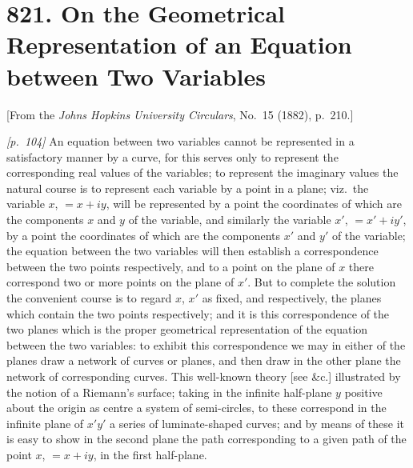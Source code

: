 \documentclass[11pt,a4paper]{article}
\theoremstyle{plain}
\theoremstyle{definition}
\theoremstyle{remark}
\begin{document}
\section*{821. On the Geometrical Representation of an Equation between Two Variables}

\begin{center}
\small[From the \textit{Johns Hopkins University Circulars}, No.~15 (1882), p.~210.]
\end{center}

\bigskip

\noindent\textit{[p.~104]} An equation between two variables cannot be represented in a satisfactory manner by a curve, for this serves only to represent the corresponding real values of the variables; to represent the imaginary values the natural course is to represent each variable by a point in a plane; viz.\ the variable $x$, $= x + iy$, will be represented by a point the coordinates of which are the components $x$ and $y$ of the variable, and similarly the variable $x'$, $= x' + iy'$, by a point the coordinates of which are the components $x'$ and $y'$ of the variable; the equation between the two variables will then establish a correspondence between the two points respectively, and to a point on the plane of $x$ there correspond two or more points on the plane of $x'$. But to complete the solution the convenient course is to regard $x$, $x'$ as fixed, and respectively, the planes which contain the two points respectively; and it is this correspondence of the two planes which is the proper geometrical representation of the equation between the two variables: to exhibit this correspondence we may in either of the planes draw a network of curves or planes, and then draw in the other plane the network of corresponding curves. This well-known theory [see {\&}c.] illustrated by the notion of a Riemann's surface; taking in the infinite half-plane $y$ positive about the origin as centre a system of semi-circles, to these correspond in the infinite plane of $x'y'$ a series of luminate-shaped curves; and by means of these it is easy to show in the second plane the path corresponding to a given path of the point $x$, $= x + iy$, in the first half-plane.

\bigskip

\end{document}
